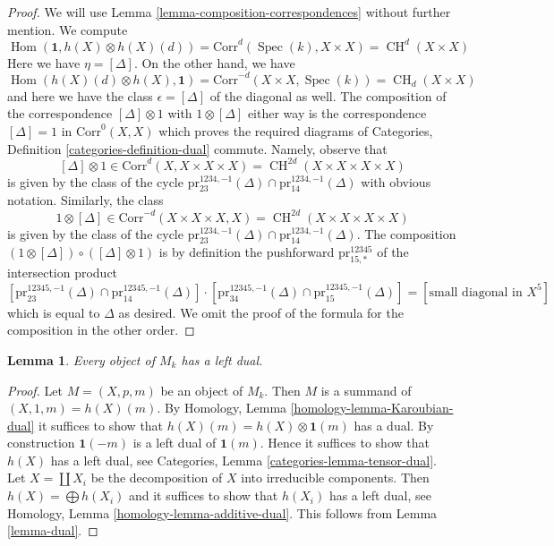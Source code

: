 \documentclass{stacks-project}
\theoremstyle{plain}
\newtheorem{lemma}[subsection]{Lemma}
\theoremstyle{definition}
\theoremstyle{remark}
\numberwithin{equation}{subsection}
\def\Spec{\mathop{\mathrm{Spec}}}
\def\Hom{\mathop{\mathrm{Hom}}\nolimits}
\def\CH{\mathop{\mathrm{CH}}\nolimits}
\begin{document}
\begin{proof}
We will use Lemma \ref{lemma-composition-correspondences}
without further mention. We compute
$$
\Hom(\mathbf{1}, h(X) \otimes h(X)(d)) =
\text{Corr}^d(\Spec(k), X \times X) = \CH^d(X \times X)
$$
Here we have $\eta = [\Delta]$. On the other hand, we have
$$
\Hom(h(X)(d) \otimes h(X), \mathbf{1}) =
\text{Corr}^{-d}(X \times X, \Spec(k)) = \CH_d(X \times X)
$$
and here we have the class $\epsilon = [\Delta]$
of the diagonal as well. The composition of the correspondence
$[\Delta] \otimes 1$ with $1 \otimes [\Delta]$ either way
is the correspondence $[\Delta] = 1$ in $\text{Corr}^0(X, X)$ which proves
the required diagrams of
Categories, Definition \ref{categories-definition-dual} commute.
Namely, observe that
$$
[\Delta] \otimes 1 \in \text{Corr}^d(X, X \times X \times X) =
\CH^{2d}(X \times X \times X \times X)
$$
is given by the class of the cycle
$\text{pr}^{1234, -1}_{23}(\Delta) \cap \text{pr}^{1234, -1}_{14}(\Delta)$ with
obvious notation. Similarly, the class
$$
1 \otimes [\Delta] \in \text{Corr}^{-d}(X \times X \times X, X) =
\CH^{2d}(X \times X \times X \times X)
$$
is given by the class of the cycle
$\text{pr}^{1234, -1}_{23}(\Delta) \cap \text{pr}^{1234, -1}_{14}(\Delta)$.
The composition $(1 \otimes [\Delta]) \circ ([\Delta] \otimes 1)$
is by definition the pushforward $\text{pr}^{12345}_{15, *}$
of the intersection product
$$
[\text{pr}^{12345, -1}_{23}(\Delta) \cap \text{pr}^{12345, -1}_{14}(\Delta)]
\cdot
[\text{pr}^{12345, -1}_{34}(\Delta) \cap \text{pr}^{12345, -1}_{15}(\Delta)]
=
[\text{small diagonal in } X^5]
$$
which is equal to $\Delta$ as desired. We omit the proof of the formula
for the composition in the other order.
\end{proof}

\begin{lemma}
\label{lemma-dual-general}
Every object of $M_k$ has a left dual.
\end{lemma}

\begin{proof}
Let $M = (X, p, m)$ be an object of $M_k$. Then $M$ is a summand of
$(X, 1, m) = h(X)(m)$.
By Homology, Lemma \ref{homology-lemma-Karoubian-dual}
it suffices to show that
$h(X)(m) = h(X) \otimes \mathbf{1}(m)$ has a dual.
By construction $\mathbf{1}(-m)$ is a left dual of $\mathbf{1}(m)$.
Hence it suffices to show that $h(X)$ has a left dual, see
Categories, Lemma \ref{categories-lemma-tensor-dual}.
Let $X = \coprod X_i$ be the decomposition of $X$ into
irreducible components. Then $h(X) = \bigoplus h(X_i)$
and it suffices to show that $h(X_i)$ has a left dual, see
Homology, Lemma \ref{homology-lemma-additive-dual}.
This follows from Lemma \ref{lemma-dual}.
\end{proof}
\end{document}
